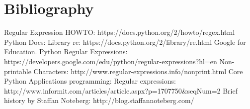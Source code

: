 \documentclass{beamer}
\begin{document}
\section{Bibliography}
\begin{frame}
Regular Expression HOWTO: https://docs.python.org/2/howto/regex.html
Python Docs: Library re: https://docs.python.org/2/library/re.html
Google for Education. Python Regular Expressions: https://developers.google.com/edu/python/regular-expressions?hl=en
Non-printable Characters: http://www.regular-expressions.info/nonprint.html
Core Python Applications programming: Regular expressions: http://www.informit.com/articles/article.aspx?p=1707750&seqNum=2
Brief history by Staffan Noteberg: http://blog.staffannoteberg.com/
\end{frame}
\end{document}
